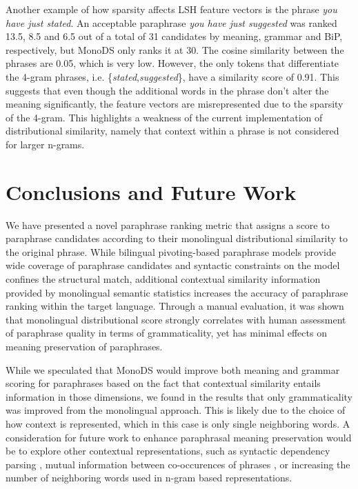 \documentclass[11pt]{article}
\newcommand{\mnote}[1]{\marginpar{\raggedleft\footnotesize\itshape#1}}
\begin{document}
{{%
Another example of how sparsity affects LSH feature vectors is the phrase \emph{you have just stated}. An acceptable paraphrase \emph{you have just suggested} was ranked 13.5, 8.5 and 6.5 out of a total of 31 candidates by meaning, grammar and BiP, respectively, but MonoDS only ranks it at 30. The cosine similarity between the phrases are 0.05, which is very low. However, the only tokens that differentiate the 4-gram phrases, i.e. \{\emph{stated},\emph{suggested}\}, have a similarity score of 0.91. This suggests that even though the additional words in the phrase don't alter the meaning significantly, the feature vectors are misrepresented due to the sparsity of the 4-gram. This highlights a weakness of the current implementation of distributional similarity, namely that context within a phrase is not considered for larger n-grams.

\vspace{-.2cm}
\section{Conclusions and Future Work}
\vspace{-.2cm}
We have presented a novel paraphrase ranking metric that assigns a score to paraphrase candidates according to their monolingual distributional similarity to the original phrase. While bilingual pivoting-based paraphrase models provide wide coverage of paraphrase candidates and syntactic constraints on the model confines the structural match, additional contextual similarity information provided by monolingual semantic statistics increases the accuracy of paraphrase ranking within the target language. %
Through a manual evaluation, it was shown that monolingual distributional score strongly correlates with human assessment of paraphrase quality in terms of grammaticality, yet has minimal effects on meaning preservation of paraphrases.

While we speculated that MonoDS would improve both meaning and grammar scoring
for paraphrases based on the fact that contextual similarity entails information
in those dimensions, we found in the results that only grammaticality was
improved from the monolingual approach. This is likely due to the choice of how
context is represented, which in this case is only single neighboring words. A
consideration for future work to enhance paraphrasal meaning preservation would
be to explore other contextual representations, such as syntactic dependency
parsing \cite{LinACL97}, mutual information between co-occurences of phrases
, or increasing the number of neighboring words used in
n-gram based representations.

}}
\end{document}
